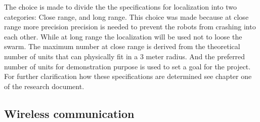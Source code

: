 \documentclass[10pt,a4paper]{article}
\begin{document}
\begin{table}[h]
\centering
{}
\caption{Swarming localization specifications}
\label{smrange}
\end{table}

\begin{table}[h]
\centering
{}
\caption{Specifications number of units}
\label{specunits}
\end{table}


The choice is made to divide the the specifications for localization into two categories: Close range, and long range. This choice was made because at close range more precision precision is needed to prevent the robots from crashing into each other. While at long range the localization will be used not to loose the swarm. The maximum number at close range is derived from the theoretical number of units that can physically fit in a 3 meter radius. And the preferred number of units for demonstration purpose is used to set a goal for the project. For further clarification how these specifications are determined see chapter one of the research document.



\subsection{Wireless communication}
\end{document}
